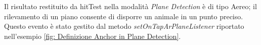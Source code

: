 \documentclass[crop=false, class=book]{standalone}
\begin{document}
	\begin{flushleft}
		Il risultato restituito da hitTest nella modalità \emph{Plane Detection} è di tipo Aereo; il rilevamento di un piano 			consente di disporre un animale in un punto preciso. Questo evento è stato gestito dal metodo 									\textit{setOnTapArPlaneListener} riportato nell'esempio \vref{fig: Definizione Anchor in Plane Detection}.\\
	\end{flushleft}
			
	
\end{document}
